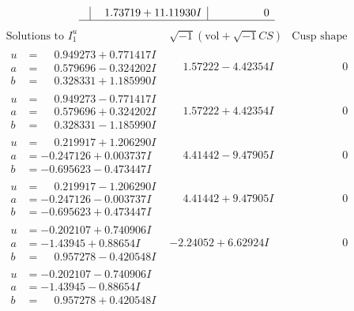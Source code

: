 \documentclass[1p]{elsarticle_modified}
\theoremstyle{definition}
\newcommand{\I}{\sqrt{-1}}
\begin{document}
$$\begin{array}{c|c|c}
 & \phantom{-}1.73719 + 11.11930 I & \phantom{-0.000000 } 0\\
 \hline 
 \end{array}$$\newpage$$\begin{array}{c|c|c}  
\text{Solutions to }I^u_{1}& \I (\text{vol} + \sqrt{-1}CS) & \text{Cusp shape}\\
 \hline 
\begin{aligned}
u &= \phantom{-}0.949273 + 0.771417 I \\
a &= \phantom{-}0.579696 - 0.324202 I \\
b &= \phantom{-}0.328331 + 1.185990 I\end{aligned}
 & \phantom{-}1.57222 - 4.42354 I & \phantom{-0.000000 } 0 \\ \hline\begin{aligned}
u &= \phantom{-}0.949273 - 0.771417 I \\
a &= \phantom{-}0.579696 + 0.324202 I \\
b &= \phantom{-}0.328331 - 1.185990 I\end{aligned}
 & \phantom{-}1.57222 + 4.42354 I & \phantom{-0.000000 } 0 \\ \hline\begin{aligned}
u &= \phantom{-}0.219917 + 1.206290 I \\
a &= -0.247126 + 0.003737 I \\
b &= -0.695623 - 0.473447 I\end{aligned}
 & \phantom{-}4.41442 - 9.47905 I & \phantom{-0.000000 } 0 \\ \hline\begin{aligned}
u &= \phantom{-}0.219917 - 1.206290 I \\
a &= -0.247126 - 0.003737 I \\
b &= -0.695623 + 0.473447 I\end{aligned}
 & \phantom{-}4.41442 + 9.47905 I & \phantom{-0.000000 } 0 \\ \hline\begin{aligned}
u &= -0.202107 + 0.740906 I \\
a &= -1.43945 + 0.88654 I \\
b &= \phantom{-}0.957278 - 0.420548 I\end{aligned}
 & -2.24052 + 6.62924 I & \phantom{-0.000000 } 0 \\ \hline\begin{aligned}
u &= -0.202107 - 0.740906 I \\
a &= -1.43945 - 0.88654 I \\
b &= \phantom{-}0.957278 + 0.420548 I\end{aligned}

\end{array}$$
\end{document}
